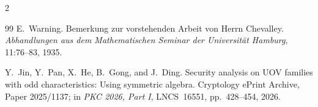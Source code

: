 \documentclass[11pt,a4paper]{article}
\theoremstyle{definition}
\theoremstyle{remark}
\begin{document}
\begin{multicols}{2}
\begin{thebibliography}{99}
E.~Warning.
\newblock Bemerkung zur vorstehenden Arbeit von Herrn Chevalley.
\newblock \emph{Abhandlungen aus dem Mathematischen Seminar der Universit\"at Hamburg}, 11:76--83, 1935.

Y.~Jin, Y.~Pan, X.~He, B.~Gong, and J.~Ding.
\newblock Security analysis on UOV families with odd characteristics: Using symmetric algebra.
\newblock Cryptology ePrint Archive, Paper 2025/1137; in \emph{PKC 2026, Part I}, LNCS~16551, pp.~428--454, 2026.

\end{thebibliography}
\end{multicols}
\end{document}
